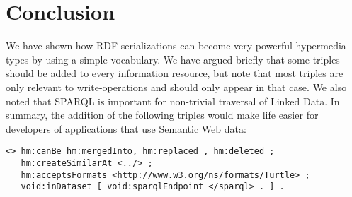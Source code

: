 \documentclass{llncs}
\begin{document}
\section{Conclusion}

We have shown how RDF serializations can become very powerful
hypermedia types by using a simple vocabulary. We have argued briefly
that some triples should be added to every information resource, but
note that most triples are only relevant to write-operations and
should only appear in that case. We also noted that SPARQL is
important for non-trivial traversal of Linked Data. In summary, the
addition of the following triples would make life easier for
developers of applications that use Semantic Web data:

\begin{verbatim}
<> hm:canBe hm:mergedInto, hm:replaced , hm:deleted ;
   hm:createSimilarAt <../> ;
   hm:acceptsFormats <http://www.w3.org/ns/formats/Turtle> ;
   void:inDataset [ void:sparqlEndpoint </sparql> . ] .
\end{verbatim}


%
%

\end{document}

